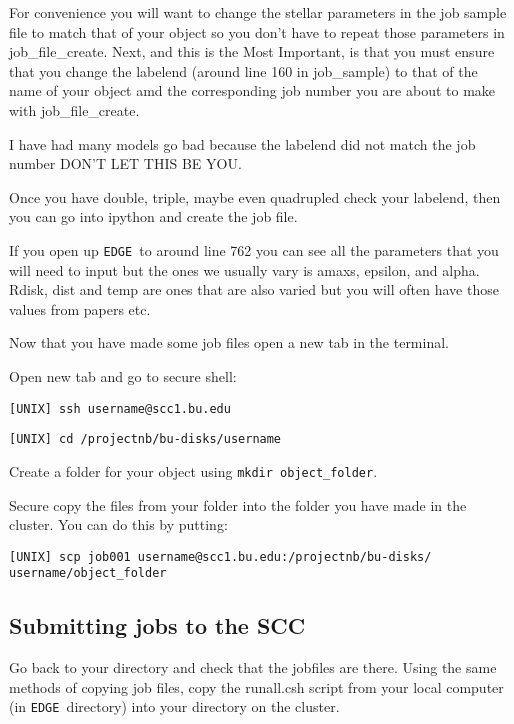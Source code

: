 \documentclass{article}
\newcommand{\edge}{\texttt{EDGE }}
\begin{document}
For convenience you will want to change the stellar parameters in the job sample file to match that of your object so you don’t have to repeat those parameters in job\_file\_create. Next, and this is the Most Important, is that you must ensure that you change the labelend (around line 160 in job\_sample) to that of the name of your object amd the corresponding job number you are about to make with job\_file\_create. 

I have had many models go bad because the labelend did not match the job number DON’T LET THIS BE YOU. 

Once you have double, triple, maybe even quadrupled check your labelend, then you can go into ipython and create the job file.
 
If you open up \edge to around line 762 you can see all the parameters that you will need to input but the ones we usually vary is amaxs, epsilon, and alpha. Rdisk, dist and temp are ones that are also varied but you will often have those values from papers etc. 

Now that you have made some job files open a new tab in the terminal.

Open new tab and go to secure shell: 

\vspace{2mm}
\texttt{[UNIX] ssh username@scc1.bu.edu}
\vspace{2mm}

\vspace{2mm}
\texttt{[UNIX] cd /projectnb/bu-disks/username}
\vspace{2mm}

Create a folder for your object using \texttt{mkdir object\_folder}.

Secure copy the files from your folder into the folder you have made in the cluster. You can do this by putting:

\vspace{2mm}
\texttt{[UNIX] scp job001 username@scc1.bu.edu:/projectnb/bu-disks/}\\
\texttt{username/object\_folder}
\vspace{2mm}

\subsection{Submitting jobs to the SCC}

Go back to your directory and check that the jobfiles are there. Using the same methods of copying job files, copy the runall.csh script from your local computer (in \edge directory) into your directory on the cluster. 
\end{document}
